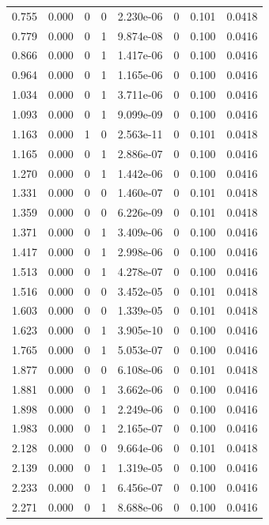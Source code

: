 \documentclass[preview]{standalone}
\begin{document}
{{\begin{tabular}{L{1.2cm}C{1.2cm} C{0.3cm}C{0.5cm} C{1.4cm}C{1.4cm} C{1.4cm}C{1.4cm}}
  0.755  &  0.000  & 0     &  0 &  2.230e-06  & 0  & 0.101 &  0.0418   \\ 
  0.779  &  0.000  & 0     &  1 &  9.874e-08  & 0  & 0.100 &  0.0416   \\ 
  0.866  &  0.000  & 0     &  1 &  1.417e-06  & 0  & 0.100 &  0.0416   \\ 
  0.964  &  0.000  & 0     &  1 &  1.165e-06  & 0  & 0.100 &  0.0416   \\ 
  1.034  &  0.000  & 0     &  1 &  3.711e-06  & 0  & 0.100 &  0.0416   \\ 
  1.093  &  0.000  & 0     &  1 &  9.099e-09  & 0  & 0.100 &  0.0416   \\ 
  1.163  &  0.000  & 1     &  0 &  2.563e-11  & 0  & 0.101 &  0.0418   \\ 
  1.165  &  0.000  & 0     &  1 &  2.886e-07  & 0  & 0.100 &  0.0416   \\ 
  1.270  &  0.000  & 0     &  1 &  1.442e-06  & 0  & 0.100 &  0.0416   \\ 
  1.331  &  0.000  & 0     &  0 &  1.460e-07  & 0  & 0.101 &  0.0418   \\ 
  1.359  &  0.000  & 0     &  0 &  6.226e-09  & 0  & 0.101 &  0.0418   \\ 
  1.371  &  0.000  & 0     &  1 &  3.409e-06  & 0  & 0.100 &  0.0416   \\ 
  1.417  &  0.000  & 0     &  1 &  2.998e-06  & 0  & 0.100 &  0.0416   \\ 
  1.513  &  0.000  & 0     &  1 &  4.278e-07  & 0  & 0.100 &  0.0416   \\ 
  1.516  &  0.000  & 0     &  0 &  3.452e-05  & 0  & 0.101 &  0.0418   \\ 
  1.603  &  0.000  & 0     &  0 &  1.339e-05  & 0  & 0.101 &  0.0418   \\ 
  1.623  &  0.000  & 0     &  1 &  3.905e-10  & 0  & 0.100 &  0.0416   \\ 
  1.765  &  0.000  & 0     &  1 &  5.053e-07  & 0  & 0.100 &  0.0416   \\ 
  1.877  &  0.000  & 0     &  0 &  6.108e-06  & 0  & 0.101 &  0.0418   \\ 
  1.881  &  0.000  & 0     &  1 &  3.662e-06  & 0  & 0.100 &  0.0416   \\ 
  1.898  &  0.000  & 0     &  1 &  2.249e-06  & 0  & 0.100 &  0.0416   \\ 
  1.983  &  0.000  & 0     &  1 &  2.165e-07  & 0  & 0.100 &  0.0416   \\ 
  2.128  &  0.000  & 0     &  0 &  9.664e-06  & 0  & 0.101 &  0.0418   \\ 
  2.139  &  0.000  & 0     &  1 &  1.319e-05  & 0  & 0.100 &  0.0416   \\ 
  2.233  &  0.000  & 0     &  1 &  6.456e-07  & 0  & 0.100 &  0.0416   \\ 
  2.271  &  0.000  & 0     &  1 &  8.688e-06  & 0  & 0.100 &  0.0416   \\ 
\hline 
\end{tabular} 

}}
\end{document}
